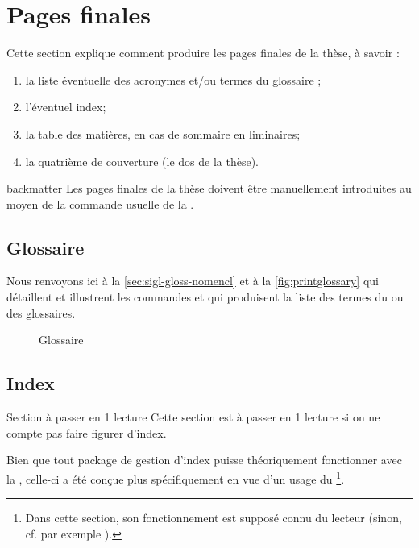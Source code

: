 \chapter{Pages finales}
\label{cha:pages-finales}

Cette section explique comment produire les pages finales de la thèse,
à savoir :
\begin{enumerate}
\item la liste éventuelle des acronymes et/ou
  termes du glossaire ;
\item l'éventuel index;
\item la table des matières, en cas de sommaire en \glspl{liminaire};
\item la quatrième de couverture (le dos de la thèse).
\end{enumerate}

\begin{docCommand}[doc description=\mandatory]{backmatter}{}
  Les pages finales de la thèse doivent être manuellement introduites au moyen
  de la commande usuelle  de la
  \nofrontmatter.
\end{docCommand}

\section{Glossaire}

Nous renvoyons ici à la \vref{sec:sigl-gloss-nomencl} et à la
\vref{fig:printglossary} qui détaillent et illustrent les commandes
 et  qui produisent
la liste des termes du ou des glossaires.

\begin{figure}[htbp]
  \centering
  \caption{Glossaire}
  \label{fig:printglossary}
\end{figure}

\section{Index}

\begin{dbremark*}{Section à passer en 1\iere{} lecture}
  Cette section est à passer en 1\iere{} lecture si on ne compte pas faire
  figurer d'index.
\end{dbremark*}

Bien que tout package de gestion d'index puisse théoriquement fonctionner avec
la \yatcl, celle-ci a été conçue plus spécifiquement en vue d'un usage du
\footnote{Dans cette section, son fonctionnement est supposé
  connu du lecteur (sinon, cf. par exemple \cite{en-ligne7}).}.


